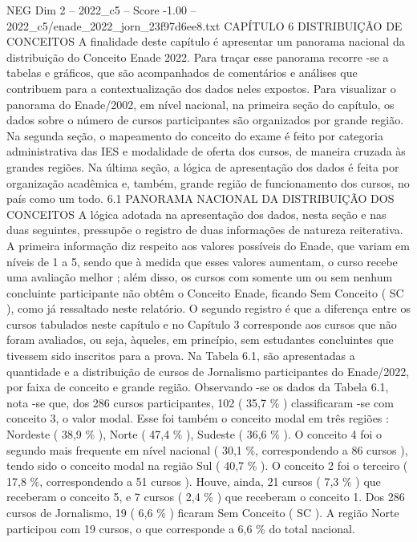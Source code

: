 \begin{textsample}{NEG Dim 2 – 2022\_c5 – Score -1.00 – 2022\_c5/enade\_2022\_jorn\_23f97d6ee8.txt}  \label{ex:f2_neg_214}
CAPÍTULO 6 DISTRIBUIÇÃO DE CONCEITOS A finalidade deste capítulo é apresentar um panorama nacional da distribuição do Conceito Enade 2022.
Para traçar esse panorama recorre -se a tabelas e gráficos, que são acompanhados de comentários e análises que contribuem para a contextualização dos dados neles expostos.
Para visualizar o panorama do Enade/2002, em nível nacional, na primeira seção do capítulo, os dados sobre o número de cursos participantes são organizados por grande região.
Na segunda seção, o mapeamento do conceito do exame é feito por categoria administrativa das IES e modalidade de oferta dos cursos, de maneira cruzada às grandes regiões.
Na última seção, a lógica de apresentação dos dados é feita por organização acadêmica e, também, grande região de funcionamento dos cursos, no país como um todo. 6.1 PANORAMA NACIONAL DA DISTRIBUIÇÃO DOS CONCEITOS A lógica adotada na apresentação dos dados, nesta seção e nas duas seguintes, pressupõe o registro de duas informações de natureza reiterativa.
A primeira informação diz respeito aos valores possíveis do Enade, que variam em níveis de 1 a 5, sendo que à medida que esses valores aumentam, o curso recebe uma avaliação melhor ; além disso, os cursos com somente um ou sem nenhum concluinte participante não obtêm o Conceito Enade, ficando Sem Conceito ( SC ), como já ressaltado neste relatório.
O segundo registro é que a diferença entre os cursos tabulados neste capítulo e no Capítulo 3 corresponde aos cursos que não foram avaliados, ou seja, àqueles, em princípio, sem estudantes concluintes que tivessem sido inscritos para a prova.
Na Tabela 6.1, são apresentadas a quantidade e a distribuição de cursos de Jornalismo participantes do Enade/2022, por faixa de conceito e grande região.
Observando -se os dados da Tabela 6.1, nota -se que, dos 286 cursos participantes, 102 ( 35,7 \% ) classificaram -se com conceito 3, o valor modal.
Esse foi também o conceito modal em três regiões : Nordeste ( 38,9 \% ), Norte ( 47,4 \% ), Sudeste ( 36,6 \% ).
O conceito 4 foi o segundo mais frequente em nível nacional ( 30,1 \%, correspondendo a 86 cursos ), tendo sido o conceito modal na região Sul ( 40,7 \% ).
O conceito 2 foi o terceiro ( 17,8 \%, correspondendo a 51 cursos ).
Houve, ainda, 21 cursos ( 7,3 \% ) que receberam o conceito 5, e 7 cursos ( 2,4 \% ) que receberam o conceito 1.
Dos 286 cursos de Jornalismo, 19 ( 6,6 \% ) ficaram Sem Conceito ( SC ).
A região Norte participou com 19 cursos, o que corresponde a 6,6 \% do total nacional.

\end{textsample}

